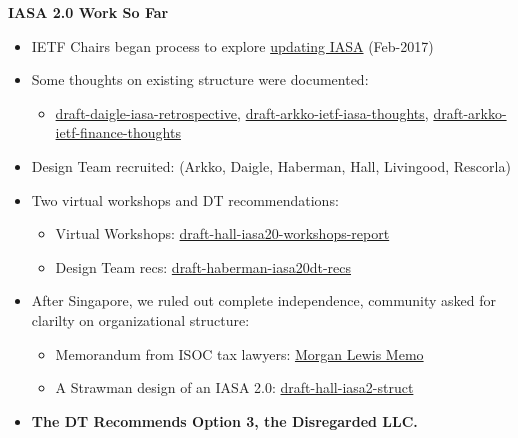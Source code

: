 \documentclass[helvetica]{seminar}
\newcommand{\heading}[1]{%
  \begin{center} 
    \large\bf 
    #1 
  \end{center} 
  \vspace{.4 in}}
\begin{document}
\begin{slide}

\heading{IASA 2.0 Work So Far}

{\footnotesize

  \vspace{-8ex}
\begin{itemize}
\item IETF Chairs began process to explore
  \href{https://mailarchive.ietf.org/arch/msg/ietf/NBhbbeFr-UZq86YnjUn2XKEEDUk}{updating
    IASA} (Feb-2017)
\item Some thoughts on existing structure were documented:
  \begin{itemize}
  \item \href{https://tools.ietf.org/html/draft-daigle-iasa-retrospective-01}{draft-daigle-iasa-retrospective}, \href{https://tools.ietf.org/html/draft-arkko-ietf-iasa-thoughts-00}{draft-arkko-ietf-iasa-thoughts}, \href{https://tools.ietf.org/html/draft-arkko-ietf-finance-thoughts-00}{draft-arkko-ietf-finance-thoughts}
  \end{itemize}
\item Design Team recruited: (Arkko, Daigle, Haberman, Hall,
  Livingood, Rescorla)
\item Two virtual workshops and DT recommendations:
  \begin{itemize}
  \item Virtual Workshops:
    \href{https://tools.ietf.org/html/draft-hall-iasa20-workshops-report-00}{draft-hall-iasa20-workshops-report}
  \item Design Team recs:
    \href{https://tools.ietf.org/html/draft-haberman-iasa20dt-recs-01}{draft-haberman-iasa20dt-recs}
  \end{itemize}
\item After Singapore, we ruled out complete independence, community
  asked for clarilty on organizational structure:
  \begin{itemize}
  \item Memorandum from ISOC tax lawyers:
    \href{https://mailarchive.ietf.org/arch/msg/iasa20/XT_3vfd3OWVFCW335mRrvWuusaI/}{Morgan
      Lewis Memo}
  \item A Strawman design of an IASA 2.0:
    \href{https://datatracker.ietf.org/doc/draft-hall-iasa2-struct/}{draft-hall-iasa2-struct}
  \end{itemize}
\item \textbf{The DT Recommends Option 3, the Disregarded LLC.}
\end{itemize}

}
\end{slide}
\end{document}
